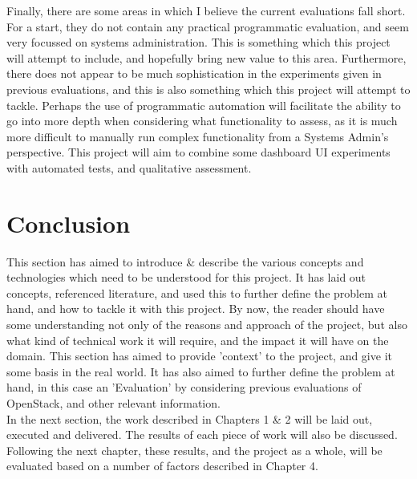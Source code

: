 Finally, there are some areas in which I believe the current evaluations fall short. For a start, they do not contain any practical programmatic evaluation, and seem very focussed on systems administration. This is something which this project will attempt to include, and hopefully bring new value to this area. Furthermore, there does not appear to be much sophistication in the experiments given in previous evaluations, and this is also something which this project will attempt to tackle. Perhaps the use of programmatic automation will facilitate the ability to go into more depth when considering what functionality to assess, as it is much more difficult to manually run complex functionality from a Systems Admin's perspective. This project will aim to combine some dashboard UI experiments with automated tests, and qualitative assessment. 

\section{Conclusion}

This section has aimed to introduce \& describe the various concepts and technologies which need to be understood for this project. It has laid out concepts, referenced literature, and used this to further define the problem at hand, and how to tackle it with this project. By now, the reader should have some understanding not only of the reasons and approach of the project, but also what kind of technical work it will require, and the impact it will have on the domain. This section has aimed to provide 'context' to the project, and give it some basis in the real world. It has also aimed to further define the problem at hand, in this case an 'Evaluation' by considering previous evaluations of OpenStack, and other relevant information.  \\
In the next section, the work described in Chapters 1 \& 2 will be laid out, executed and delivered. The results of each piece of work will also be discussed. Following the next chapter, these results, and the project as a whole, will be evaluated based on a number of factors described in Chapter 4.    
